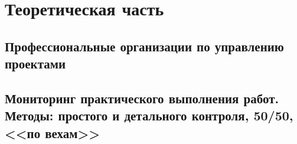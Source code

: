 \section{Теоретическая часть}
\subsection{Профессиональные организации по управлению проектами}







\subsection{Мониторинг практического выполнения работ. Методы: простого и детального контроля, 50/50, <<по вехам>>}